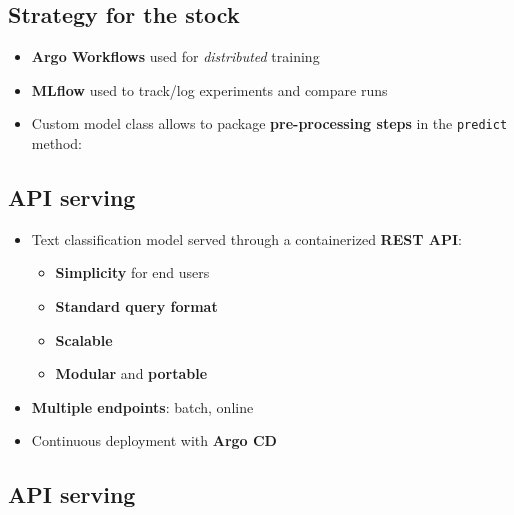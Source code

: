 \documentclass[
  letterpaper,
  DIV=11,
  numbers=noendperiod]{scrartcl}
\providecommand{\tightlist}{%
  \setlength{\itemsep}{0pt}\setlength{\parskip}{0pt}}\usepackage{longtable,booktabs,array}
\begin{document}
\subsection{Strategy for the stock}\label{strategy-for-the-stock}

\begin{itemize}
\tightlist
\item
  {\textbf{Argo Workflows}} used for \emph{distributed} training
\item
  {\textbf{MLflow}} used to track/log experiments and compare runs
\item
  Custom model class allows to package {\textbf{pre-processing steps}}
  in the \texttt{predict} method:
\end{itemize}

\subsection{API serving}\label{api-serving-2}

\begin{itemize}
\tightlist
\item
  Text classification model served through a containerized {\textbf{REST
  API}}:

  \begin{itemize}
  \tightlist
  \item
    {\textbf{Simplicity}} for end users
  \item
    {\textbf{Standard query format}}
  \item
    {\textbf{Scalable}}
  \item
    {\textbf{Modular}} and {\textbf{portable}}
  \end{itemize}
\item
  {\textbf{Multiple endpoints}}: batch, online
\item
  Continuous deployment with {\textbf{Argo CD}}
\end{itemize}

\subsection{API serving}\label{api-serving-3}
\end{document}
